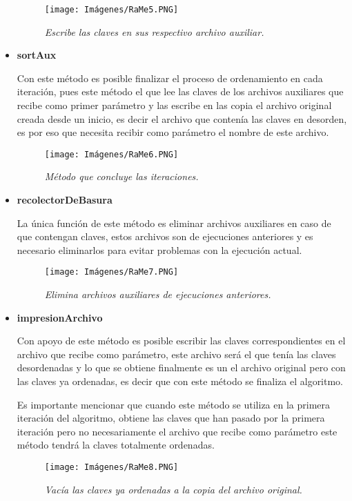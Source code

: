 \documentclass[letterpaper,12pt]{extarticle}
\begin{document}
\begin{itemize}
    
    \begin{figure}[h!]
    \centering
    \texttt{[image: Imágenes/RaMe5.PNG]}
    \caption{\textit{Escribe las claves en sus respectivo archivo auxiliar.}}
    \label{fig:RaMe5}
    \end{figure} 
     
    \item\textbf{sortAux}
    
    Con este método es posible finalizar el proceso de ordenamiento en cada iteración, pues este método el que lee las claves de los archivos auxiliares que recibe como primer parámetro y las escribe en las copia el archivo original creada desde un inicio, es decir el archivo que contenía las claves en desorden, es por eso que necesita recibir como parámetro el nombre de este archivo.
    
    \begin{figure}[h!]
    \centering
    \texttt{[image: Imágenes/RaMe6.PNG]}
    \caption{\textit{Método que concluye las iteraciones.}}
    \label{fig:RaMe6}
    \end{figure} 
    
    \item\textbf{recolectorDeBasura}
    
    La única función de este método  es eliminar archivos auxiliares en caso de que contengan claves, estos archivos son de ejecuciones anteriores y es necesario eliminarlos para evitar problemas con la ejecución actual.
    
    \begin{figure}[h!]
    \centering
    \texttt{[image: Imágenes/RaMe7.PNG]}
    \caption{\textit{Elimina archivos auxiliares de ejecuciones anteriores.}}
    \label{fig:RaMe7}
    \end{figure}
    
    \pagebreak
    
    \item\textbf{impresionArchivo}
    
    Con apoyo de este método es posible escribir las claves correspondientes en el archivo que recibe como parámetro, este archivo será el que tenía las claves desordenadas y lo que se obtiene finalmente es un el archivo original pero con las claves ya ordenadas, es decir que con este método se finaliza el algoritmo.

    Es importante mencionar que cuando este método se utiliza en la primera iteración del algoritmo, obtiene las claves que han pasado por la primera iteración pero no necesariamente el archivo que recibe como parámetro este método tendrá la claves totalmente ordenadas.


    
    \begin{figure}[h!]
    \centering
    \texttt{[image: Imágenes/RaMe8.PNG]}
    \caption{\textit{Vacía las claves ya ordenadas a la copia del archivo original.}}
    \label{fig:RaMe8}
    \end{figure} 
    
\end{itemize}
\end{document}
